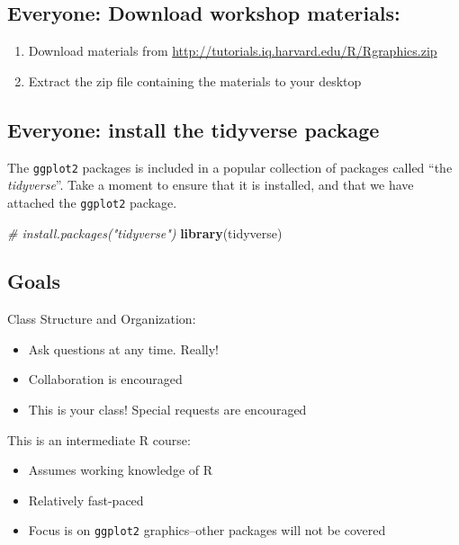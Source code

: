 \documentclass[]{book}
\newenvironment{Shaded}{\begin{snugshade}}{\end{snugshade}}
\newcommand{\KeywordTok}[1]{\textcolor[rgb]{0.13,0.29,0.53}{\textbf{#1}}}
\newcommand{\CommentTok}[1]{\textcolor[rgb]{0.56,0.35,0.01}{\textit{#1}}}
\newcommand{\NormalTok}[1]{#1}
\providecommand{\tightlist}{%
  \setlength{\itemsep}{0pt}\setlength{\parskip}{0pt}}
\begin{document}
\subsection{Everyone: Download workshop
materials:}\label{everyone-download-workshop-materials}

\begin{enumerate}
\def\labelenumi{\arabic{enumi}.}
\item
  Download materials from
  \url{http://tutorials.iq.harvard.edu/R/Rgraphics.zip}
\item
  Extract the zip file containing the materials to your desktop
\end{enumerate}

\subsection{Everyone: install the tidyverse
package}\label{everyone-install-the-tidyverse-package}

The \texttt{ggplot2} packages is included in a popular collection of
packages called ``the \emph{tidyverse}''. Take a moment to ensure that
it is installed, and that we have attached the \texttt{ggplot2} package.

\begin{Shaded}
\begin{Highlighting}[]
\CommentTok{# install.packages("tidyverse")}
\KeywordTok{library}\NormalTok{(tidyverse)}
\end{Highlighting}
\end{Shaded}

\subsection{Goals}\label{goals-2}

Class Structure and Organization:

\begin{itemize}
\tightlist
\item
  Ask questions at any time. Really!
\item
  Collaboration is encouraged
\item
  This is your class! Special requests are encouraged
\end{itemize}

This is an intermediate R course:

\begin{itemize}
\tightlist
\item
  Assumes working knowledge of R
\item
  Relatively fast-paced
\item
  Focus is on \texttt{ggplot2} graphics--other packages will not be
  covered
\end{itemize}
\end{document}
